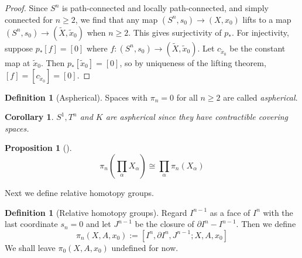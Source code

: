 \documentclass[reqno]{amsart}
\newtheorem{proposition}[theorem]{Proposition}
\newtheorem{corollary}[theorem]{Corollary}
\theoremstyle{definition}
\newtheorem{definition}[theorem]{Definition}
\theoremstyle{remark}
\begin{document}
  \begin{proof}
      Since 
      $S^{n}$ is path-connected and locally path-connected,
      and simply connected for $n\ge 2$, we find that
      any map
      $\left( S^{n},s_0 \right) 
      \to \left( X, x_0 \right) $ lifts to a 
      map $\left( S^{n},s_0 \right) \to 
      \left( \tilde{X},\tilde{x}_0 \right) $ when
      $n\ge 2$. This gives surjectivity of
      $p_*$.
      For injectivity, suppose
      $p_* \left[ f \right] = \left[ 0 \right] $ where
      $f \colon \left( S^{n}, s_0 \right) \to 
      \left( \tilde{X},\tilde{x}_0 \right) $.
      Let $c_{\tilde{x}_0}$ be the constant map at
      $\tilde{x}_0$. Then
      $p_* \left[ \tilde{x}_0 \right] =
      \left[ 0 \right] $, so by uniqueness of the
      lifting theorem, 
      $\left[ f \right] = \left[ c_{\tilde{x}_0} \right] =
      \left[ 0 \right] $.
  \end{proof}

  \begin{definition}[Aspherical]
      Spaces with $\pi_n = 0$ for all
      $n\ge 2$ are called \textit{aspherical}.
  \end{definition}

  \begin{corollary}
      $S^{1}, T^{n}$ and $K$ are aspherical since
      they have contractible covering spaces.
  \end{corollary}


  \begin{proposition}[]
      \[
      \pi_n \left( \prod_{\alpha} X_{\alpha} \right) 
      \cong \prod_{\alpha} \pi_n \left( X_{\alpha} \right) 
      \] 
  \end{proposition}

  Next we define relative homotopy groups.

  \begin{definition}[Relative homotopy groups]
      Regard $I^{n-1}$ as a face of $I^{n}$ with the last
      coordinate $s_n = 0$ and let
      $J^{n-1}$ be the closure of
      $\partial I^{n}- I^{n-1}$. Then
      we define 
      \[
      \pi_n \left( X, A, x_0 \right) 
      := \left[ I^{n},\partial I^{n}, J^{n-1};
      X , A , x_0\right] 
      \] 
      We shall leave $\pi_0 \left( X, A, x_0 \right) $ undefined
      for now.
  \end{definition}
\end{document}
